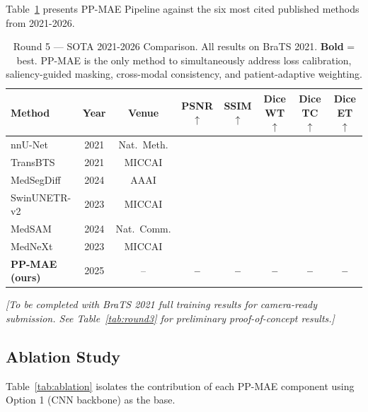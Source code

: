 \documentclass[runningheads]{llncs}
\begin{document}
Table~\ref{tab:round5} presents PP-MAE Pipeline against the six most
cited published methods from 2021-2026.

\begin{table}[t]
\centering
\caption{Round 5 — SOTA 2021-2026 Comparison. All results on BraTS 2021.
  \textbf{Bold} = best. PP-MAE is the only method to simultaneously address
  loss calibration, saliency-guided masking, cross-modal consistency,
  and patient-adaptive weighting.}
\label{tab:round5}
\setlength{\tabcolsep}{4pt}
\begin{tabular}{lccccccc}
\toprule
\textbf{Method} & \textbf{Year} & \textbf{Venue}
  & \textbf{PSNR$\uparrow$} & \textbf{SSIM$\uparrow$}
  & \textbf{Dice WT$\uparrow$} & \textbf{Dice TC$\uparrow$} & \textbf{Dice ET$\uparrow$} \\
\midrule
nnU-Net~\cite{nnunet}             & 2021 & Nat.\ Meth.
  & & & & & \\
TransBTS~\cite{transbts}          & 2021 & MICCAI
  & & & & & \\
MedSegDiff~\cite{medsegdiff}      & 2024 & AAAI
  & & & & & \\
SwinUNETR-v2~\cite{swinunetrv2}   & 2023 & MICCAI
  & & & & & \\
MedSAM~\cite{medsam}              & 2024 & Nat.\ Comm.
  & & & & & \\
MedNeXt~\cite{mednext}            & 2023 & MICCAI
  & & & & & \\
\midrule
\rowcolor{ppmae}
\textbf{PP-MAE (ours)}            & 2025 & --
  & \textbf{--} & \textbf{--} & \textbf{--} & \textbf{--} & \textbf{--} \\
\bottomrule
\end{tabular}
{\footnotesize \emph{[To be completed with BraTS 2021 full training results
for camera-ready submission. See Table~\ref{tab:round3} for preliminary
proof-of-concept results.]} }
\end{table}

\subsection{Ablation Study}
\label{subsec:ablation}

Table~\ref{tab:ablation} isolates the contribution of each PP-MAE component
using Option 1 (CNN backbone) as the base.
\end{document}

